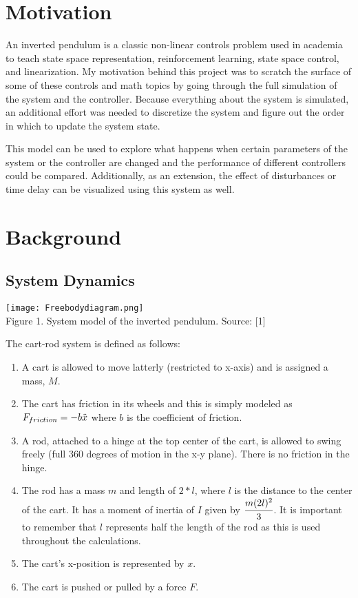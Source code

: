 \documentclass{article}
\begin{document}
\section{Motivation}

An inverted pendulum is a classic non-linear controls problem used in academia to teach state space representation, reinforcement learning, state space control, and linearization. My motivation behind this project was to scratch the surface of some of these controls and math topics by going through the full simulation of the system and the controller. Because everything about the system is simulated, an additional effort was needed to discretize the system and figure out the order in which to update the system state.

This model can be used to explore what happens when certain parameters of the system or the controller are changed and the performance of different controllers could be compared. Additionally, as an extension, the effect of disturbances or time delay can be visualized using this system as well. 

\section{Background}
\subsection{System Dynamics}

\begin{center}
    \texttt{[image: Freebodydiagram.png]} \\
    Figure 1. System model of the inverted pendulum. Source: [1]
\end{center}
\vspace{3 mm}

\noindent The cart-rod system is defined as follows:
\begin{enumerate}
    \item A cart is allowed to move latterly (restricted to x-axis) and is assigned a mass, $M$.
    \item The cart has friction in its wheels and this is simply modeled as \\ $F_{friction} = -b\Ddot{x}$ where $b$ is the coefficient of friction.
    \item A rod, attached to a hinge at the top center of the cart, is allowed to swing freely (full 360 degrees of motion in the x-y plane). There is no friction in the hinge.
    \item The rod has a mass $m$ and length of $2*l$, where $l$ is the distance to the center of the cart. It has a moment of inertia of $I$ given by $\cfrac{m(2l)^2}{3}$. It is important to remember that $l$ represents half the length of the rod as this is used throughout the calculations.
    \item The cart's x-position is represented by $x$. 
    \item The cart is pushed or pulled by a force $F$. 
\end{enumerate}
\end{document}
